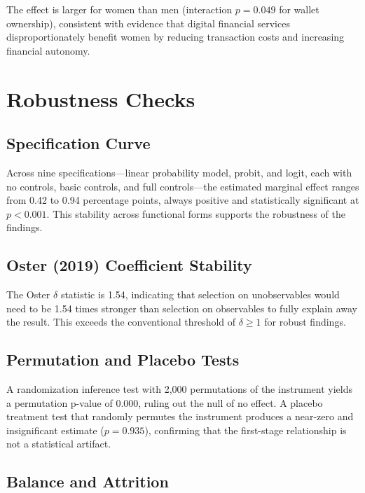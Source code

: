 \documentclass[12pt,a4paper]{article}
\begin{document}


The effect is larger for women than men (interaction $p = 0.049$ for wallet
ownership), consistent with evidence that digital financial services
disproportionately benefit women by reducing transaction costs and increasing
financial autonomy.

\section{Robustness Checks}
\label{sec:robustness}



\subsection{Specification Curve}

Across nine specifications---linear probability model, probit, and logit, each
with no controls, basic controls, and full controls---the estimated marginal
effect ranges from 0.42 to 0.94 percentage points, always positive and
statistically significant at $p < 0.001$. This stability across functional
forms supports the robustness of the findings.

\subsection{Oster (2019) Coefficient Stability}

The Oster $\delta$ statistic is 1.54, indicating that selection on
unobservables would need to be 1.54 times stronger than selection on
observables to fully explain away the result. This exceeds the conventional
threshold of $\delta \geq 1$ for robust findings.

\subsection{Permutation and Placebo Tests}

A randomization inference test with 2,000 permutations of the instrument
yields a permutation p-value of 0.000, ruling out the null of no effect.
A placebo treatment test that randomly permutes the instrument produces a
near-zero and insignificant estimate ($p = 0.935$), confirming that the
first-stage relationship is not a statistical artifact.

\subsection{Balance and Attrition}
\end{document}
